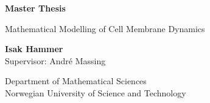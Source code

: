 \documentclass[10pt]{article}
\begin{document}
\begin{titlepage}
    \begin{center}
        \vspace*{1cm}

        \Huge
        \textbf{Master Thesis}

        \vspace{0.5cm}
        \Large
        Mathematical Modelling of Cell Membrane Dynamics  \\

        \vspace{1.5cm}

        \textbf{Isak Hammer} \\
        \vspace{0.5cm}
        Supervisor: André Massing


        \vfill

        \vspace{0.8cm}


        \Large
        Department of Mathematical Sciences\\
        Norwegian University of Science and Technology\\

    \end{center}

\end{titlepage}

    \newpage
    \label{sec:eyyy}


    
    
    

    \newpage
    \printbibliography
\end{document}
